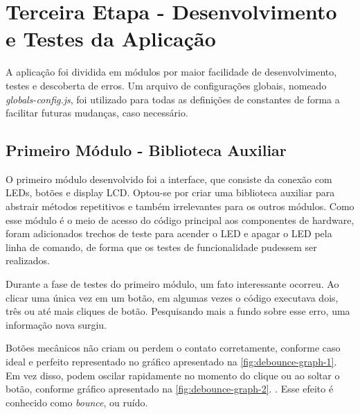 \section{Terceira Etapa - Desenvolvimento e Testes da Aplicação}\label{sec:terceira-etapa}

A aplicação foi dividida em módulos por maior facilidade de desenvolvimento, testes e descoberta de erros. Um arquivo de configurações globais, nomeado \textit{globals-config.js}, foi utilizado para todas as definições de constantes de forma a facilitar futuras mudanças, caso necessário. 

\subsection{Primeiro Módulo - Biblioteca Auxiliar}\label{sec:primeiro-modulo}

O primeiro módulo desenvolvido foi a interface, que consiste da conexão com LEDs, botões e display LCD. Optou-se por criar uma biblioteca auxiliar para abstrair métodos repetitivos e também irrelevantes para os outros módulos. Como esse módulo é o meio de acesso do código principal aos componentes de hardware, foram adicionados trechos de teste para acender o LED e apagar o LED pela linha de comando, de forma que os testes de funcionalidade pudessem ser realizados.

Durante a fase de testes do primeiro módulo, um fato interessante ocorreu. Ao clicar uma única vez em um botão, em algumas vezes o código executava dois, três ou até mais cliques de botão. Pesquisando mais a fundo sobre esse erro, uma informação nova surgiu. 

Botões mecânicos não criam ou perdem o contato corretamente, conforme caso ideal e perfeito representado no gráfico apresentado na \autoref{fig:debounce-graph-1}. Em vez disso, podem oscilar rapidamente no momento do clique ou ao soltar o botão, conforme gráfico apresentado na \autoref{fig:debounce-graph-2}. \cite{debounce-graph}. Esse efeito é conhecido como \textit{bounce}, ou ruído.

